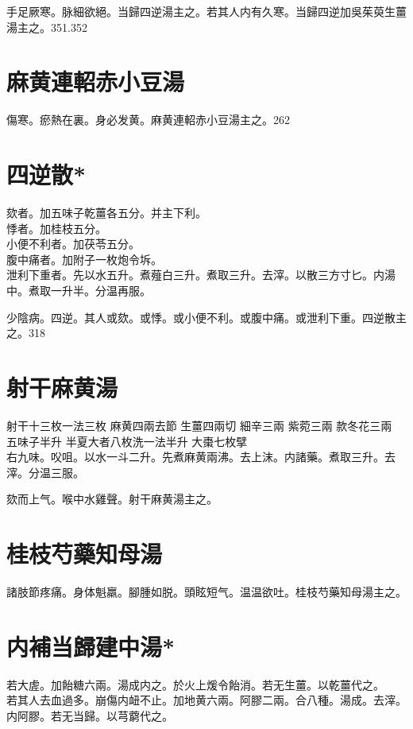 手足厥寒。脉細欲絕。当歸四逆湯主之。若其人内有久寒。当歸四逆加吳茱萸生薑湯主之。351.352

\section{麻黄連軺赤小豆湯}

傷寒。瘀熱在裏。身必发黄。麻黄連軺赤小豆湯主之。262

\section{四逆散*}

欬者。加五味子乾薑各五分。并主下利。\\
悸者。加桂枝五分。\\
小便不利者。加茯苓五分。\\
腹中痛者。加附子一枚炮令坼。\\
泄利下重者。先以水五升。煮薤白三升。煮取三升。去滓。以散三方寸匕。内湯中。煮取一升半。分温再服。

少陰病。四逆。其人或欬。或悸。或小便不利。或腹中痛。或泄利下重。四逆散主之。318

\section{射干麻黄湯}

射干{\scriptsize 十三枚一法三枚} 麻黄{\scriptsize 四兩去節} 生薑{\scriptsize 四兩切} 細辛{\scriptsize 三兩} 紫菀{\scriptsize 三兩} 款冬花{\scriptsize 三兩} 五味子{\scriptsize 半升} 半夏{\scriptsize 大者八枚洗一法半升} 大棗{\scriptsize 七枚擘}\\
右九味。㕮咀。以水一斗二升。先煮麻黄兩沸。去上沫。内諸藥。煮取三升。去滓。分温三服。

欬而上气。喉中水雞聲。射干麻黄湯主之。

\section{桂枝芍藥知母湯}

諸肢節疼痛。身体魁羸。腳腫如脱。頭眩短气。温温欲吐。桂枝芍藥知母湯主之。

\section{内補当歸建中湯*}

若大虗。加飴糖六兩。湯成内之。於火上煖令飴消。若无生薑。以乾薑代之。\\
若其人去血過多。崩傷内衄不止。加地黄六兩。阿膠二兩。合八種。湯成。去滓。内阿膠。若无当歸。以芎藭代之。

